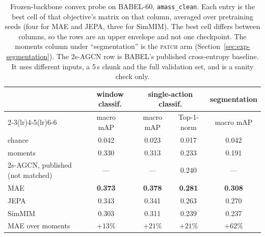 \begin{table}[t]
\centering
\small
\begin{tabular}{lccccc}
\toprule
& \multicolumn{2}{c}{window classif.} & \multicolumn{2}{c}{single-action classif.} & segmentation \\
\cmidrule(lr){2-3}\cmidrule(lr){4-5}\cmidrule(lr){6-6}
& macro mAP & & macro mAP & Top-1-norm & macro mAP \\
\midrule
chance                         & 0.042 & & 0.023 & 0.017 & 0.042 \\
moments                        & 0.330 & & 0.313 & 0.233 & 0.191 \\
2s-AGCN, published (not matched) & ---   & & ---   & 0.240 & ---   \\
\midrule
MAE                            & \textbf{0.373} & & \textbf{0.378} & \textbf{0.281} & \textbf{0.308} \\
JEPA                           & 0.343 & & 0.341 & 0.263 & 0.270 \\
SimMIM                         & 0.303 & & 0.311 & 0.239 & 0.237 \\
\midrule
MAE over moments               & $+13\%$ & & $+21\%$ & $+21\%$ & $+62\%$ \\
\bottomrule
\end{tabular}
\caption{Frozen-backbone convex probe on BABEL-60, \texttt{amass\_clean}. Each entry is
the best cell of that objective's matrix on that column, averaged over pretraining seeds
(four for MAE and JEPA, three for SimMIM). The best cell differs between columns, so the
rows are an upper envelope and not one checkpoint. The moments column under ``segmentation''
is the \textsc{patch} arm (Section~\ref{sec:exp-segmentation}). The 2s-AGCN row is BABEL's
published cross-entropy baseline. It uses different inputs, a 5\,s chunk and the full
validation set, and is a sanity check only.}
\label{tab:exp-babel}
\end{table}

